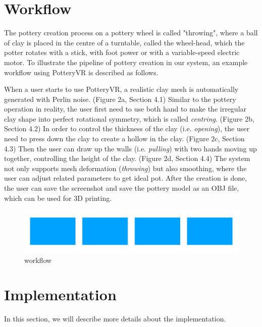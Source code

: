 \section{Workflow}
\label{sec:3}

The pottery creation process on a pottery wheel is called "throwing", where a ball of clay is placed in the centre of a turntable, called the wheel-head, which the potter rotates with a stick, with foot power or with a variable-speed electric motor.
To illustrate the pipeline of pottery creation in our system, an example workflow using PotteryVR is described as follows.

When a user starts to use PotteryVR, a realistic clay mesh is automatically generated with Perlin noise. (Figure 2a, Section 4.1)
Similar to the pottery operation in reality, the user first need to use both hand to make the irregular clay shape into perfect rotational symmetry, which is called \textit{centring}. (Figure 2b, Section 4.2)
In order to control the thickness of the clay (i.e. \textit{opening}), the user need to press down the clay to create a hollow in the clay. (Figure 2c, Section 4.3)
Then the user can draw up the walls (i.e. \textit{pulling}) with two hands moving up together, controlling the height of the clay. (Figure 2d, Section 4.4)
The system not only supports mesh deformation (\textit{throwing}) but also smoothing, where the user can adjust related parameters to get ideal pot.
After the creation is done, the user can save the screenshot and save the pottery model as an OBJ file, which can be used for 3D printing.
\begin{figure}
  \includegraphics[width=\textwidth]{t2.pdf}
\caption{workflow}
\label{fig:1}       %
\end{figure}


\section{Implementation}
\label{sec:4}

In this section, we will describe more details about the implementation. 

